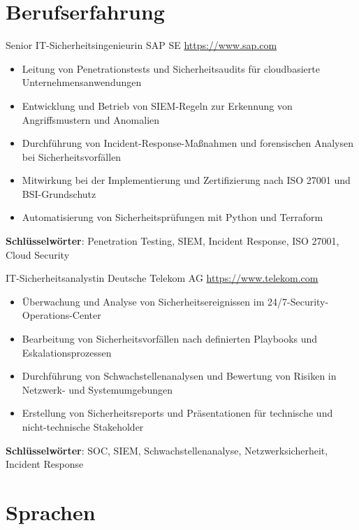 \documentclass[a4paper, serif, 10pt]{moderncv}
\begin{document}
\section{Berufserfahrung}

        {Senior IT-Sicherheitsingenieurin}
        {SAP SE}
        {\url{https://www.sap.com}}
        {}
        {\begin{itemize}
\item Leitung von Penetrationstests und Sicherheitsaudits für cloudbasierte Unternehmensanwendungen
\item Entwicklung und Betrieb von SIEM-Regeln zur Erkennung von Angriffsmustern und Anomalien
\item Durchführung von Incident-Response-Maßnahmen und forensischen Analysen bei Sicherheitsvorfällen
\item Mitwirkung bei der Implementierung und Zertifizierung nach ISO 27001 und BSI-Grundschutz
\item Automatisierung von Sicherheitsprüfungen mit Python und Terraform
\end{itemize}
\textbf{Schlüsselwörter}: Penetration Testing, SIEM, Incident Response, ISO 27001, Cloud Security}

        {IT-Sicherheitsanalystin}
        {Deutsche Telekom AG}
        {\url{https://www.telekom.com}}
        {}
        {\begin{itemize}
\item Überwachung und Analyse von Sicherheitsereignissen im 24/7-Security-Operations-Center
\item Bearbeitung von Sicherheitsvorfällen nach definierten Playbooks und Eskalationsprozessen
\item Durchführung von Schwachstellenanalysen und Bewertung von Risiken in Netzwerk- und Systemumgebungen
\item Erstellung von Sicherheitsreports und Präsentationen für technische und nicht-technische Stakeholder
\end{itemize}
\textbf{Schlüsselwörter}: SOC, SIEM, Schwachstellenanalyse, Netzwerksicherheit, Incident Response}
\section{Sprachen}

\end{document}
